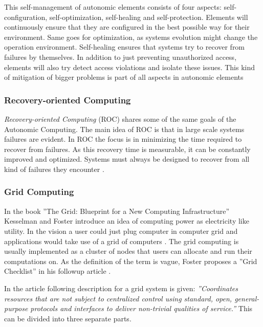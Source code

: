 \documentclass{tktltiki}
\begin{document}
This self-management of autonomic elements consists of four aspects: self-configuration, self-optimization, self-healing and self-protection.  Elements will continuously ensure that they are configured in the best possible way for their environment.  Same goes for optimization, as systems evolution might change the operation environment.  Self-healing ensures that systems try to recover from failures by themselves.  In addition to just preventing unauthorized access, elements will also try detect access violations and isolate these issues.  This kind of mitigation of bigger problems is part of all aspects in autonomic elements \cite{autonomic_research, autonomic_vision}


\subsubsection*{Recovery-oriented Computing}

\emph{Recovery-oriented Computing} (ROC) shares some of the same goals of the Autonomic Computing.  The main idea of ROC is that in large scale systems failures are evident.  In ROC the focus is in minimizing the time required to recover from failures.  As this recovery time is measurable, it can be constantly improved and optimized.  Systems must always be designed to recover from all kind of failures they encounter \cite{ROC}.


\subsubsection{Grid Computing}

In the book ''The Grid: Blueprint for a New Computing Infrastructure'' Kesselman and Foster introduce an idea of computing power as electricity like utility.  In the vision a user could just plug computer in computer grid and applications would take use of a grid  of computers \cite{TheGrid08}. The grid computing is usually implemented as a cluster of nodes that users can allocate and run their computations on.   As the definition of the term is vague, Foster proposes a ''Grid Checklist'' in his followup article \cite{WhatIsGrid02}.

In the article following description for a grid system is given: \emph{''Coordinates resources that are not subject to centralized control using standard, open, general-purpose protocols and interfaces to deliver non-trivial qualities of service.''}  This can be divided into three separate parts.
\end{document}
